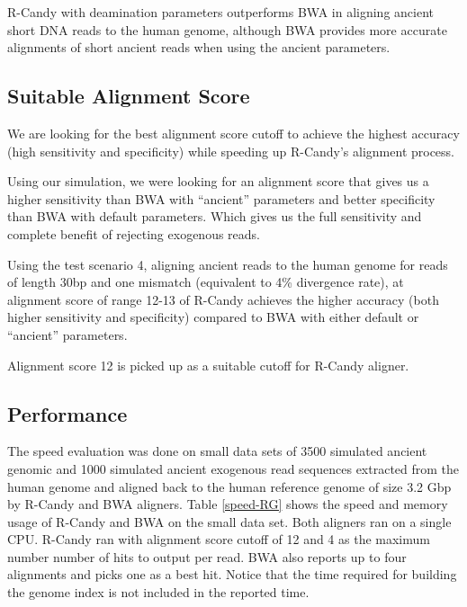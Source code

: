 \documentclass[11pt,a4paper]{report}
\newcommand{\quotes}[1]{``#1''}
\begin{document}
R-Candy with deamination parameters outperforms BWA in aligning ancient 
short DNA reads to the human genome, although 
BWA provides more accurate alignments of short 
ancient reads when using the ancient parameters. 
 



\subsection{Suitable Alignment Score} 
\label{Suitable Alignment Score}

We are looking for the best alignment score cutoff to achieve the 
highest accuracy (high sensitivity and specificity) while speeding 
up R-Candy's alignment process.

Using our simulation, we were looking for an alignment score that 
gives us a higher sensitivity than BWA with \quotes{ancient} parameters 
and better specificity than BWA with default parameters.
Which gives us the full sensitivity and complete benefit of rejecting
exogenous reads. 

Using the test scenario 4, aligning ancient reads to the human
genome for reads of length 30bp and one mismatch (equivalent to 4\% 
divergence rate), at alignment score of range 12-13 of R-Candy 
achieves the higher accuracy (both higher sensitivity and 
specificity) compared to BWA with either default or \quotes{ancient} 
parameters.

Alignment score 12 is picked up as a suitable cutoff for R-Candy aligner. 


\subsection{Performance} \label{Performance}

The speed evaluation was done on small data sets of 3500 simulated ancient 
genomic and 1000 simulated ancient exogenous read sequences extracted from
the human genome and aligned back to the human reference genome of size 3.2 
Gbp by R-Candy and BWA aligners.
Table \ref{speed-RG} shows the speed and memory usage of R-Candy and BWA on 
the small data set. Both aligners ran on a single CPU. 
R-Candy ran with alignment score cutoff of 12 and 4 as the maximum
number number of hits to output per read. BWA also reports up to four
alignments and picks one as a best hit.  Notice that the time required for
building the genome index is not included in the reported time.\\
\end{document}
